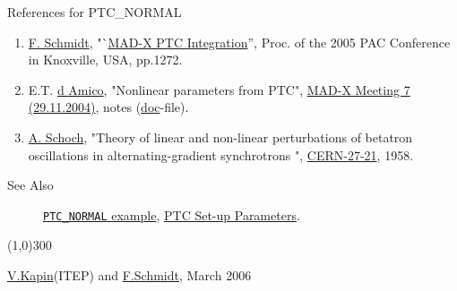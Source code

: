 \begin{description}
	\item[References for PTC\_NORMAL] 
\end{description}
\begin{enumerate}
	\item \href{F._Schmidt}{F. Schmidt}, "`\href{http://cern.ch/madx/doc/MPPE012.pdf}{MAD-X PTC Integration}'',          Proc. of the 2005 PAC Conference in Knoxville, USA, pp.1272.
	\item E.T. \href{d Amico}{d Amico}, "Nonlinear parameters from PTC",         \href{http://cern.ch/frs/MAD-X_minutes/Meeting-7}{MAD-X          Meeting 7 (29.11.2004)}, notes (\href{http://cern.ch/frs/MAD-X_minutes/Meeting-7/Nonlinear_parameters_from_PTC.doc}{doc}-file).
	\item \href{A._Schoch}{A. Schoch}, "Theory of linear and non-linear          perturbations of betatron oscillations in alternating-gradient          synchrotrons ",         \href{http://cern.ch/madx/doc/yellow-report-1957.pdf}{CERN-27-21}, 1958.
\end{enumerate}
\begin{description}
	\item[See Also]
	\text{ \\}	
	
	 \href{http://cern.ch/frs/mad-X_examples/ptc_normal}{\texttt{PTC\_NORMAL} example},         \href{../ptc_general/ptc_general.html}{PTC          Set-up Parameters}.
\end{description}

\line(1,0){300}

\href{mailto:kapin@itep.ru}{  V.Kapin}(ITEP) and \href{mailto:Frank.Schmidt@cern.ch}{  F.Schmidt}, March  2006

